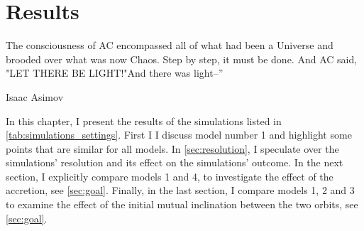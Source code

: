 \chapter{Results}\label{simulations}

\epigraph{The consciousness of AC encompassed all of what had been a Universe and brooded over what was now Chaos. Step by step, it must be done. And AC said, "LET THERE BE LIGHT!"And there was light--”}{Isaac Asimov}

In this chapter, I present the results of the simulations listed in \cref{tab:simulations_settings}. First I I discuss model number 1 and highlight some points that are similar for all models. In \cref{sec:resolution}, I speculate over the simulations' resolution and its effect on the simulations' outcome. In the next section, I explicitly compare models 1 and 4, to investigate the effect of the accretion, see \cref{sec:goal}. Finally, in the last section, I compare models 1, 2 and 3 to examine the effect of the initial mutual inclination between the two orbits, see \cref{sec:goal}.


